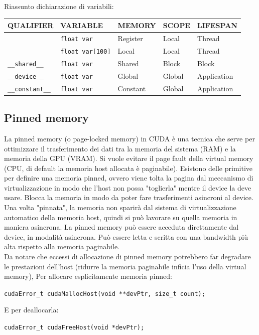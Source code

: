 Riassunto dichiarazione di variabili: 
\begin{center}
	\begin{tabular}{|l|l|l|l|l|}
		\hline
		\textbf{QUALIFIER} & \textbf{VARIABLE} & \textbf{MEMORY} & \textbf{SCOPE} & \textbf{LIFESPAN} \\
		\hline
		& \texttt{float var} & Register & Local & Thread \\
		\hline
		& \texttt{float var[100]} & Local & Local & Thread \\
		\hline
		\texttt{\_\_shared\_\_} & \texttt{float var} & Shared & Block & Block \\
		\hline
		\texttt{\_\_device\_\_} & \texttt{float var} & Global & Global & Application \\
		\hline
		\texttt{\_\_constant\_\_} & \texttt{float var} & Constant & Global & Application \\
		\hline
	\end{tabular}
\end{center}

\newpage

\subsection{Pinned memory}
La pinned memory (o page-locked memory) in CUDA è una tecnica che serve per ottimizzare il trasferimento dei dati tra la memoria del sistema (RAM) e la memoria della GPU (VRAM). Si vuole evitare il page fault della virtual memory (CPU, di default la memoria host allocata è paginabile). Esistono delle primitive per definire una memoria pinned, ovvero viene tolta la pagina dal meccanismo di virtualizzazione in modo che l'host non possa "toglierla" mentre il device la deve usare. Blocca la memoria in modo da poter fare trasferimenti asincroni al device.\\

Una volta "pinnata", la memoria non sparirà dal sistema di virtualizzazione automatico della memoria host, quindi si può lavorare su quella memoria in maniera asincrona. La pinned memory può essere acceduta direttamente dal device, in modalità asincrona. Può essere letta e scritta con una bandwidth più alta rispetto alla memoria paginabile.\\

Da notare che eccessi di allocazione di pinned memory potrebbero far degradare le prestazioni dell'host (ridurre la memoria paginabile inficia l'uso della virtual memory), Per allocare esplicitamente memoria pinned: 
\begin{center}
	\texttt{cudaError\_t cudaMallocHost(void **devPtr, size\_t count);}
\end{center}
E per deallocarla:
\begin{center}
	\texttt{cudaError\_t cudaFreeHost(void *devPtr);}
\end{center}


